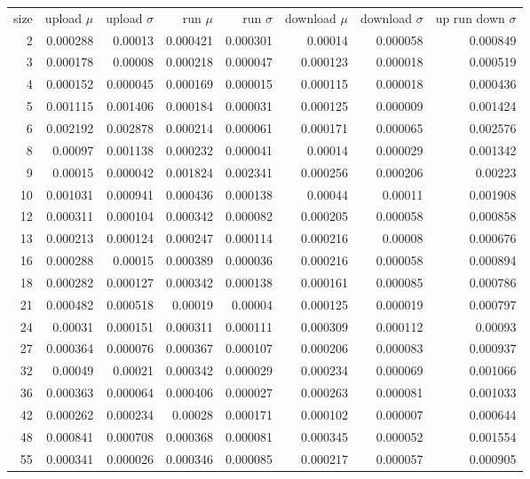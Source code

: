 \begin{longtable}{r r r r r r r r}
size & upload $\mu$  & upload $\sigma$ & run $\mu$ & run $\sigma$ & download $\mu$ & download $\sigma$ & up run down $\sigma$ \\
2 & 0.000288 & 0.00013 & 0.000421 & 0.000301 & 0.00014 & 0.000058 & 0.000849 \\
3 & 0.000178 & 0.00008 & 0.000218 & 0.000047 & 0.000123 & 0.000018 & 0.000519 \\
4 & 0.000152 & 0.000045 & 0.000169 & 0.000015 & 0.000115 & 0.000018 & 0.000436 \\
5 & 0.001115 & 0.001406 & 0.000184 & 0.000031 & 0.000125 & 0.000009 & 0.001424 \\
6 & 0.002192 & 0.002878 & 0.000214 & 0.000061 & 0.000171 & 0.000065 & 0.002576 \\
8 & 0.00097 & 0.001138 & 0.000232 & 0.000041 & 0.00014 & 0.000029 & 0.001342 \\
9 & 0.00015 & 0.000042 & 0.001824 & 0.002341 & 0.000256 & 0.000206 & 0.00223 \\
10 & 0.001031 & 0.000941 & 0.000436 & 0.000138 & 0.00044 & 0.00011 & 0.001908 \\
12 & 0.000311 & 0.000104 & 0.000342 & 0.000082 & 0.000205 & 0.000058 & 0.000858 \\
13 & 0.000213 & 0.000124 & 0.000247 & 0.000114 & 0.000216 & 0.00008 & 0.000676 \\
16 & 0.000288 & 0.00015 & 0.000389 & 0.000036 & 0.000216 & 0.000058 & 0.000894 \\
18 & 0.000282 & 0.000127 & 0.000342 & 0.000138 & 0.000161 & 0.000085 & 0.000786 \\
21 & 0.000482 & 0.000518 & 0.00019 & 0.00004 & 0.000125 & 0.000019 & 0.000797 \\
24 & 0.00031 & 0.000151 & 0.000311 & 0.000111 & 0.000309 & 0.000112 & 0.00093 \\
27 & 0.000364 & 0.000076 & 0.000367 & 0.000107 & 0.000206 & 0.000083 & 0.000937 \\
32 & 0.00049 & 0.00021 & 0.000342 & 0.000029 & 0.000234 & 0.000069 & 0.001066 \\
36 & 0.000363 & 0.000064 & 0.000406 & 0.000027 & 0.000263 & 0.000081 & 0.001033 \\
42 & 0.000262 & 0.000234 & 0.00028 & 0.000171 & 0.000102 & 0.000007 & 0.000644 \\
48 & 0.000841 & 0.000708 & 0.000368 & 0.000081 & 0.000345 & 0.000052 & 0.001554 \\
55 & 0.000341 & 0.000026 & 0.000346 & 0.000085 & 0.000217 & 0.000057 & 0.000905 \\

\end{longtable}
